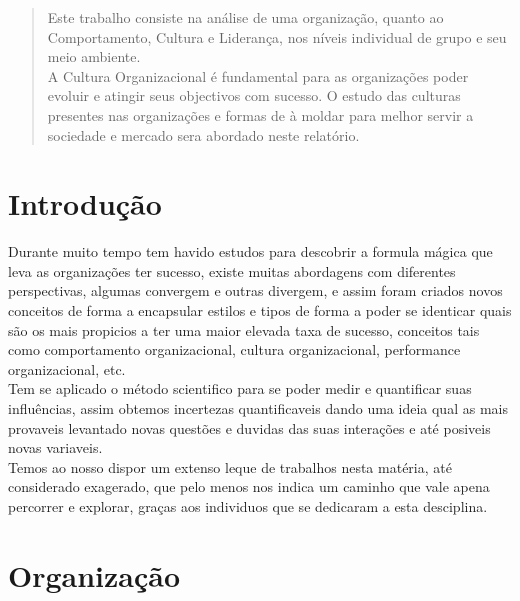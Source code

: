 
%

%
\tableofcontents
%
%
\pagestyle{plain} %
\newpage
\label{Resumo}
\begin{abstract} 
Este trabalho consiste na análise de uma organização, quanto ao Comportamento, Cultura e Liderança,
nos níveis individual de grupo e seu meio ambiente.\\

A Cultura Organizacional é fundamental para as organizações poder evoluir e atingir seus objectivos com sucesso. O estudo das culturas presentes nas organizações e formas de à moldar para melhor servir a sociedade e mercado sera abordado neste relatório.
\end{abstract}
\newpage
\section{Introdução}
Durante muito tempo tem havido estudos para descobrir a formula mágica que leva as organizações ter sucesso, existe muitas abordagens com diferentes perspectivas, algumas convergem e outras divergem, e assim foram criados novos conceitos de forma a encapsular estilos e tipos de forma a poder se identicar quais são os mais propicios a ter uma maior elevada taxa de sucesso, conceitos tais como comportamento organizacional, cultura organizacional, performance organizacional, etc.\\

Tem se aplicado o método scientifico para se poder medir e quantificar suas influências, assim obtemos incertezas quantificaveis dando uma ideia qual as mais provaveis levantado novas questões e duvidas das suas interações e até posiveis novas variaveis.\\

Temos ao nosso dispor um extenso leque de trabalhos nesta matéria, até considerado exagerado, que pelo menos nos indica um caminho que vale apena percorrer e explorar, graças aos individuos que se dedicaram a esta desciplina.\\


\section{Organização}

